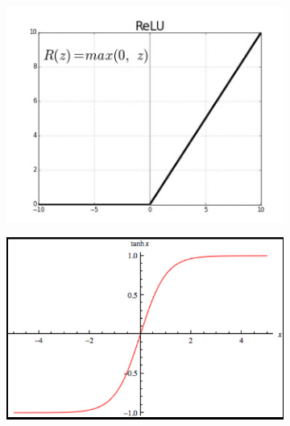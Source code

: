 \begin{figure}[ht]
  \centering
  \begin{subfigure}{0.3\textwidth}
    \centering
    \includegraphics[width=\linewidth]{images/chapter2_img/relu_graph.jpg}
    \label{subfig:relu}
  \end{subfigure}
  \begin{subfigure}{0.3\textwidth}
    \centering
    \includegraphics[width=\linewidth]{images/chapter2_img/tanh_graph.jpg}
    \label{subfig:tanh}
  \end{subfigure}
  \begin{subfigure}{0.3\textwidth}
    \centering

\end{subfigure}
\end{figure}
